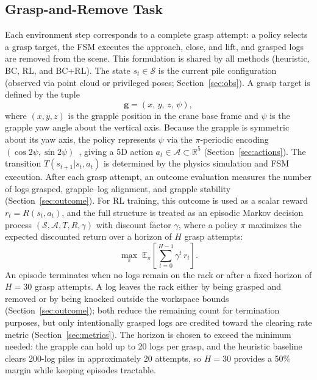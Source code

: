 \documentclass[letterpaper, 10 pt, conference]{ieeeconf}
\begin{document}
\subsection{Grasp-and-Remove Task}
\label{sec:formulation}
Each environment step corresponds to a complete grasp attempt: a policy selects a grasp target, the FSM executes the approach, close, and lift, and grasped logs are removed from the scene.
This formulation is shared by all methods (heuristic, BC, RL, and BC+RL).
The state $s_t \in \mathcal{S}$ is the current pile configuration (observed via point cloud or privileged poses; Section~\ref{sec:obs}).
A grasp target is defined by the tuple
\begin{equation}
    \mathbf{g} = (x,\, y,\, z,\, \psi),
\end{equation}
where $(x, y, z)$ is the grapple position in the crane base frame and $\psi$ is the grapple yaw angle about the vertical axis.
Because the grapple is symmetric about its yaw axis, the policy represents $\psi$ via the $\pi$-periodic encoding $(\cos 2\psi, \sin 2\psi)$~\cite{morrison2018closing}, giving a 5D action $a_t \in \mathcal{A} \subset \mathbb{R}^5$ (Section~\ref{sec:actions}).
The transition $T(s_{t+1}|s_t, a_t)$ is determined by the physics simulation and FSM execution.
After each grasp attempt, an outcome evaluation measures the number of logs grasped, grapple--log alignment, and grapple stability (Section~\ref{sec:outcome}).
For RL training, this outcome is used as a scalar reward $r_t = R(s_t, a_t)$, and the full structure is treated as an episodic Markov decision process $(\mathcal{S}, \mathcal{A}, T, R, \gamma)$ with discount factor $\gamma$, where a policy $\pi$ maximizes the expected discounted return over a horizon of $H$ grasp attempts:
\begin{equation}
    \max_\pi \; \mathbb{E}_\pi \!\left[\sum_{t=0}^{H-1} \gamma^t \, r_t \right].
\end{equation}
An episode terminates when no logs remain on the rack or after a fixed horizon of $H=30$ grasp attempts.
A log leaves the rack either by being grasped and removed or by being knocked outside the workspace bounds (Section~\ref{sec:outcome}); both reduce the remaining count for termination purposes, but only intentionally grasped logs are credited toward the clearing rate metric (Section~\ref{sec:metrics}).
The horizon is chosen to exceed the minimum needed: the grapple can hold up to 20 logs per grasp, and the heuristic baseline clears 200-log piles in approximately 20 attempts, so $H=30$ provides a 50\% margin while keeping episodes tractable.
\end{document}
